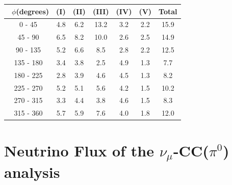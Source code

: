 \documentclass[aps, prd, reprint,showpacs,  preprintnumbers,amsmath,amssymb,superscriptaddress, nofootinbib]{revtex4-1}
\makeatletter
\newcommand{\numu}{\mbox{$\nu_{\mu}$}}                   %
\renewenvironment{table}
  {\def\@captype{table}}
  {}
\makeatother
\begin{document}

\vspace{0.5cm}

\begin{table}
\begin{tabular}{crccccc}
\hline
~$\phi$(degrees)  & (I) & (II) & (III) & (IV) & (V) & Total \\
\hline
        0 - 45 &  4.8 &  6.2 & 13.2 &  3.2 &  2.2 & 15.9 \\
       45 - 90 &  6.5 &  8.2 & 10.0 &  2.6 &  2.5 & 14.9 \\
      90 - 135 &  5.2 &  6.6 &  8.5 &  2.8 &  2.2 & 12.5 \\
     135 - 180 &  3.4 &  3.8 &  2.5 &  4.9 &  1.3 &  7.7 \\
     180 - 225 &  2.8 &  3.9 &  4.6 &  4.5 &  1.3 &  8.2 \\
     225 - 270 &  5.2 &  5.1 &  5.6 &  4.2 &  1.5 & 10.2 \\
     270 - 315 &  3.3 &  4.4 &  3.8 &  4.6 &  1.5 &  8.3 \\
     315 - 360 &  5.7 &  5.9 &  7.6 &  4.0 &  1.8 & 12.0 \\

\hline
\hline
\end{tabular}
\caption{Fractional systematic uncertainties (in percent) for $d\sigma/d\phi$. \\
NOTE: Result is for the $\Delta$-enriched subsample with $T_{p}>100$\,MeV and $W<1.4$\,GeV.}
\label{tb:syst-azimuth}
\end{table}

\vspace{1cm}


\vspace{1cm}

\section{Neutrino Flux of the $\numu$-CC($\pi^{0}$) analysis}
\end{document}
